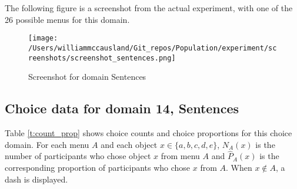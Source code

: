 \documentclass[
]{article}
\begin{document}
The following figure is a screenshot from the actual experiment, with
one of the 26 possible menus for this domain.

\begin{figure}
\centering
\texttt{[image: /Users/williammccausland/Git\_repos/Population/experiment/screenshots/screenshot\_sentences.png]}
\caption{Screenshot for domain Sentences}
\end{figure}

\pagebreak

\subsection{Choice data for domain 14,
Sentences}\label{choice-data-for-domain-14-sentences}

Table \ref{t:count_prop} shows choice counts and choice proportions for
this choice domain. For each menu \(A\) and each object
\(x \in \{a,b,c,d,e\}\), \(N_A(x)\) is the number of participants who
chose object \(x\) from menu \(A\) and \(\hat P_A(x)\) is the
corresponding proportion of participants who chose \(x\) from \(A\).
When \(x \notin A\), a dash is displayed.
\end{document}
